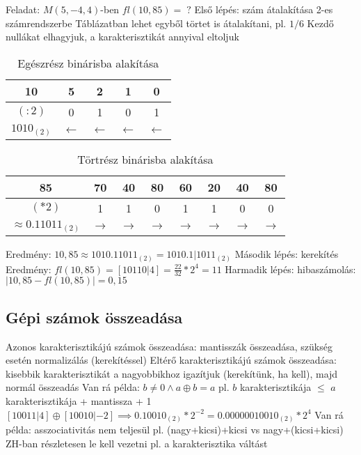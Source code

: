 \documentclass[12pt,a4paper]{article}
\begin{document}
\begin{outline}
	\1 Feladat: $M(5,-4,4)$-ben $fl(10,85) = \; ?$
	\1 Első lépés: szám átalakítása 2-es számrendszerbe
		\2 Táblázatban lehet egyből törtet is átalakítani, pl. $1/6$
		\2 Kezdő nullákat elhagyjuk, a karakterisztikát annyival eltoljuk

\begin{table}[h]
	\centering
	\begin{tabular}{|c|c|c|c|c|}
		\hline
		10 & 5 & 2 & 1 & 0 \\
		\hline
		$(:2)$ & 0 & 1 & 0 & 1 \\
		\hline
		$1010_{(2)}$ & $\leftarrow$ & $\leftarrow$ & $\leftarrow$ & $\leftarrow$ \\
		\hline
	\end{tabular}
	\caption{Egészrész binárisba alakítása}
\end{table}

\begin{table}[h]
	\centering
	\begin{tabular}{|c|c|c|c|c|c|c|c|}
		\hline
		85 & 70 & 40 & 80 & 60 & 20 & 40 & 80 \\
		\hline
		$(*2)$ & 1 & 1 & 0 & 1 & 1 & 0 & 0 \\
		\hline
		$\approx 0.11011_{(2)}$ & $\rightarrow$ & $\rightarrow$ & $\rightarrow$ & $\rightarrow$ & $\rightarrow$ & $\rightarrow$ & $\rightarrow$ \\
		\hline
	\end{tabular}
		\caption{Törtrész binárisba alakítása}
\end{table}

		\2 Eredmény: $10,85 \approx 1010.11011_{(2)} = 1010.1|1011_{(2)}$
	\1 Második lépés: kerekítés
		\2 Eredmény: $fl(10,85) = [10110|4] = \frac{22}{32} * 2^4 = 11$
	\1 Harmadik lépés: hibaszámolás: $|10,85 - fl(10,85)| = 0,15$
\end{outline}

\subsection{Gépi számok összeadása}

\begin{outline}
	\1 Azonos karakterisztikájú számok összeadása:
	mantisszák összeadása, szükség esetén normalizálás (kerekítéssel)
	\1 Eltérő karakterisztikájú számok összeadása:
	kisebbik karakterisztikát a nagyobbikhoz igazítjuk (kerekítünk, ha kell), majd normál összeadás
	\1 Van rá példa: $b \ne 0 \wedge a \oplus b = a$
		\2 pl. $b$ karakterisztikája $\le$ $a$ karakterisztikája + mantissza + 1\\
		$[10011|4] \oplus [10010|-2] \implies 0.10010_{(2)}*2^{-2} = 0.00000010010_{(2)}*2^4$
	\1 Van rá példa: asszociativitás nem teljesül
		\2 pl. (nagy+kicsi)+kicsi \; vs \; nagy+(kicsi+kicsi)
	\1 ZH-ban részletesen le kell vezetni pl. a karakterisztika váltást
\end{outline}
\end{document}
